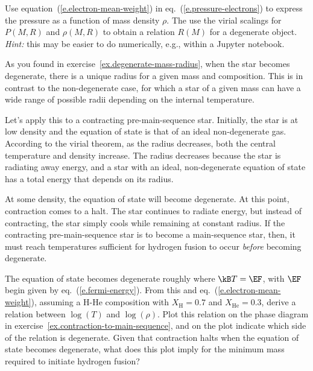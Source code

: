 \begin{exercisebox}
\label{ex.degenerate-mass-radius}
Use equation~(\ref{e.electron-mean-weight}) in eq.~(\ref{e.pressure-electrons}) to express the pressure as a function of mass density $\rho$. The use the virial scalings for $P(M,R)$ and $\rho(M,R)$ to obtain a relation $R(M)$ for a degenerate object. \emph{Hint:} this may be easier to do numerically, e.g., within a Jupyter notebook.
\end{exercisebox}

As you found in exercise~\ref{ex.degenerate-mass-radius}, when the star becomes degenerate, there is a unique radius for a given mass and composition. This is in contrast to the non-degenerate case, for which a star of a given mass can have a wide range of possible radii depending on the internal temperature.

Let's apply this to a contracting pre-main-sequence star. Initially, the star is at low density and the equation of state is that of an ideal non-degenerate gas. According to the virial theorem, as the radius decreases, both the central temperature and density increase. 
The radius decreases because the star is radiating away energy, and a star with an ideal, non-degenerate equation of state has a total energy that depends on its radius.

At some density, the equation of state will become degenerate. At this point, contraction comes to a halt. The star continues to radiate energy, but instead of contracting, the star simply cools while remaining at constant radius. If the contracting pre-main-sequence star is to become a main-sequence star, then, it must reach temperatures sufficient for hydrogen fusion to occur \emph{before} becoming degenerate.

\begin{exercisebox}
\label{ex.minimum-stellar-mass}
The equation of state becomes degenerate roughly where $\kB T=\EF$, with $\EF$ begin given by eq.~(\ref{e.fermi-energy}). From this and eq.~(\ref{e.electron-mean-weight}), assuming a H-He composition with $X_{\mathrm{H}} = 0.7$ and $X_{\mathrm{He}}=0.3$, derive a relation between $\log(T)$ and $\log(\rho)$. Plot this relation on the phase diagram in exercise~\ref{ex.contraction-to-main-sequence}, and on the plot indicate which side of the relation is degenerate.
Given that contraction halts when the equation of state becomes degenerate, what does this plot imply for the minimum mass required to initiate hydrogen fusion?
\end{exercisebox}

